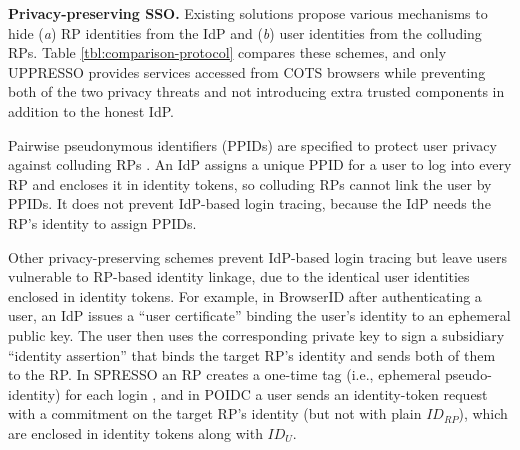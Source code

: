 

\noindent\textbf{Privacy-preserving SSO.}
Existing solutions propose various mechanisms to hide (\emph{a}) RP identities from the IdP and (\emph{b}) user identities from the colluding RPs.
Table \ref{tbl:comparison-protocol} compares these schemes,
and only UPPRESSO provides services accessed from COTS browsers while preventing both of the two privacy threats and not introducing extra trusted components in addition to the honest IdP.


Pairwise pseudonymous identifiers (PPIDs) are specified  to protect user privacy against colluding RPs \cite{OpenIDConnect, SAMLIdentifier,NIST2017draft}.
An IdP assigns a unique PPID for a user to log into every RP and encloses it in identity tokens, so colluding RPs cannot link the user by PPIDs.
It does not prevent IdP-based login tracing, because the IdP needs the RP's identity to assign PPIDs.

Other privacy-preserving schemes prevent IdP-based login tracing but leave users vulnerable to RP-based identity linkage, due to the identical user identities enclosed in identity tokens.
For example, in BrowserID \cite{BrowserID} 
after authenticating a user,
    an IdP %
issues a ``user certificate'' binding the user's identity to an ephemeral public key.
The user then uses the corresponding private key to sign a subsidiary ``identity assertion'' that binds the target RP's identity and sends both of them to the RP.
In SPRESSO an RP creates a one-time tag (i.e., ephemeral pseudo-identity) for each login \cite{SPRESSO},
 and in POIDC \cite{POIDC,save-flow} a user sends an identity-token request with a commitment on the target RP's identity (but not with plain $ID_{RP}$),
        which are enclosed in identity tokens along with $ID_U$.


